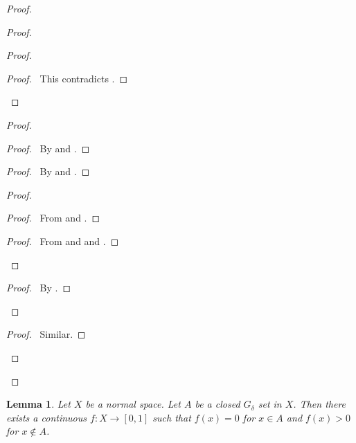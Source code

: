 \documentclass{report}
\let\qed\relax
\newtheorem{lm}{Lemma}[section]
\theoremstyle{definition}
\begin{document}
\begin{proof}
\begin{proof}
\begin{proof}
       \qedstep
       \begin{proof}
         \pf\ This contradicts .
       \end{proof}
     \end{proof}
     \begin{proof}
       \begin{proof}
         \pf\ By  and .
       \end{proof}
       \begin{proof}
         \pf\ By  and .
       \end{proof}
       \begin{proof}
         \begin{proof}
           \pf\ From  and .
         \end{proof}
         \qedstep
         \begin{proof}
           \pf\ From  and  and .
         \end{proof}
       \end{proof}
       \qedstep
       \begin{proof}
         \pf\ By .
       \end{proof}
     \end{proof}
     \begin{proof}
       \pf\ Similar.
     \end{proof}
   \end{proof}
   \qed
 \end{proof}

 \begin{lm}
 Let $X$ be a normal space. Let $A$ be a closed $G_\delta$ set in $X$. Then there exists a continuous $f : X \rightarrow [0,1]$ such that $f(x) = 0$ for $x \in A$ and $f(x) > 0$ for $x \notin A$.
 \end{lm}
\end{document}

